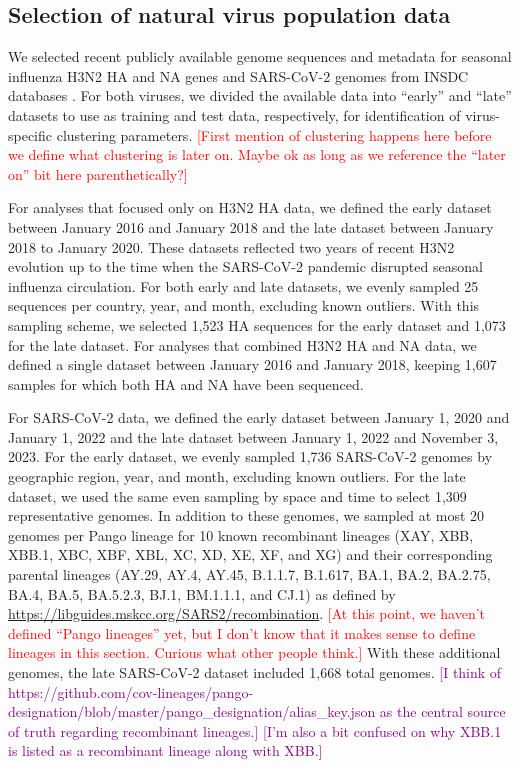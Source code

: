 \documentclass[10pt,letterpaper]{article}
\def\jhc#1{\textcolor{red}{[#1]}}
\def\tbc#1{\textcolor{purple}{[#1]}}
\begin{document}
\subsection*{Selection of natural virus population data}

We selected recent publicly available genome sequences and metadata for seasonal influenza H3N2 HA and NA genes and SARS-CoV-2 genomes from INSDC databases \cite{Arita2021}.
For both viruses, we divided the available data into ``early'' and ``late'' datasets to use as training and test data, respectively, for identification of virus-specific clustering parameters.
\jhc{First mention of clustering happens here before we define what clustering is later on. Maybe ok as long as we reference the ``later on'' bit here parenthetically?}

For analyses that focused only on H3N2 HA data, we defined the early dataset between January 2016 and January 2018 and the late dataset between January 2018 to January 2020.
These datasets reflected two years of recent H3N2 evolution up to the time when the SARS-CoV-2 pandemic disrupted seasonal influenza circulation.
For both early and late datasets, we evenly sampled 25 sequences per country, year, and month, excluding known outliers.
With this sampling scheme, we selected 1,523 HA sequences for the early dataset and 1,073 for the late dataset.
For analyses that combined H3N2 HA and NA data, we defined a single dataset between January 2016 and January 2018, keeping 1,607 samples for which both HA and NA have been sequenced.

For SARS-CoV-2 data, we defined the early dataset between January 1, 2020 and January 1, 2022 and the late dataset between January 1, 2022 and November 3, 2023.
For the early dataset, we evenly sampled 1,736 SARS-CoV-2 genomes by geographic region, year, and month, excluding known outliers.
For the late dataset, we used the same even sampling by space and time to select 1,309 representative genomes.
In addition to these genomes, we sampled at most 20 genomes per Pango lineage for 10 known recombinant lineages (XAY, XBB, XBB.1, XBC, XBF, XBL, XC, XD, XE, XF, and XG) and their corresponding parental lineages (AY.29, AY.4, AY.45, B.1.1.7, B.1.617, BA.1, BA.2, BA.2.75, BA.4, BA.5, BA.5.2.3, BJ.1, BM.1.1.1, and CJ.1) as defined by \href{https://libguides.mskcc.org/SARS2/recombination}{https://libguides.mskcc.org/SARS2/recombination}.
\jhc{At this point, we haven't defined ``Pango lineages'' yet, but I don't know that it makes sense to define lineages in this section. Curious what other people think.}
With these additional genomes, the late SARS-CoV-2 dataset included 1,668 total genomes.
\tbc{I think of https://github.com/cov-lineages/pango-designation/blob/master/pango\_designation/alias\_key.json as the central source of truth regarding recombinant lineages.}
\tbc{I'm also a bit confused on why XBB.1 is listed as a recombinant lineage along with XBB.}
\end{document}
